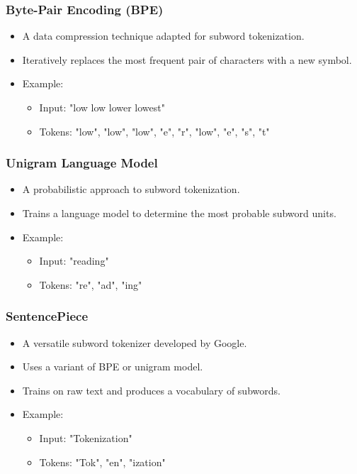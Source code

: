 \documentclass{beamer}
\begin{document}
\begin{frame}
\frametitle{Byte-Pair Encoding (BPE)}
\begin{itemize}
    \item A data compression technique adapted for subword tokenization.
    \item Iteratively replaces the most frequent pair of characters with a new symbol.
    \item Example:
    \begin{itemize}
        \item Input: "low low lower lowest"
        \item Tokens: "low", "low", "low", "e", "r", "low", "e", "s", "t"
    \end{itemize}
\end{itemize}
\end{frame}

\begin{frame}
\frametitle{Unigram Language Model}
\begin{itemize}
    \item A probabilistic approach to subword tokenization.
    \item Trains a language model to determine the most probable subword units.
    \item Example:
    \begin{itemize}
        \item Input: "reading"
        \item Tokens: "re", "ad", "ing"
    \end{itemize}
\end{itemize}
\end{frame}

\begin{frame}
\frametitle{SentencePiece}
\begin{itemize}
    \item A versatile subword tokenizer developed by Google.
    \item Uses a variant of BPE or unigram model.
    \item Trains on raw text and produces a vocabulary of subwords.
    \item Example:
    \begin{itemize}
        \item Input: "Tokenization"
        \item Tokens: "Tok", "en", "ization"
    \end{itemize}
\end{itemize}
\end{frame}
\end{document}
